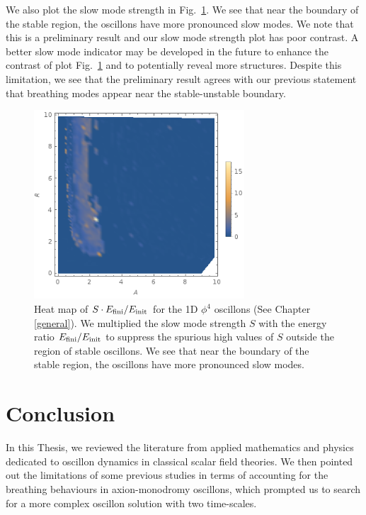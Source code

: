 \documentclass[11pt]{book}
\begin{document}
We also plot the slow mode strength in Fig.~\ref{phi4slowmode}. We see that near the boundary of the stable region, the oscillons have more pronounced slow modes. We note that this is a preliminary result and our slow mode strength plot has poor contrast. A better slow mode indicator may be developed in the future to enhance the contrast of plot Fig.~\ref{phi4slowmode} and to potentially reveal more structures. Despite this limitation, we see that the preliminary result agrees with our previous statement that breathing modes appear near the stable-unstable boundary.

\begin{figure}\centering
  \includegraphics[width=0.7\textwidth]{plot/slow-mode-phi4-1d.png}
  \caption{Heat map of $S \cdot E_{\rm fini}/E_{\rm init}$ for the 1D $\phi^4$ oscillons (See Chapter \ref{general}). We multiplied the slow mode strength $S$ with the energy ratio $E_{\rm fini}/E_{\rm init}$ to suppress the spurious high values of $S$ outside the region of stable oscillons. We see that near the boundary of the stable region, the oscillons have more pronounced slow modes.}\label{phi4slowmode}
\end{figure}

\chapter{Conclusion}

In this Thesis, we reviewed the literature from applied mathematics and physics dedicated to oscillon dynamics in classical scalar field theories. We then pointed out the limitations of some previous studies in terms of accounting for the breathing behaviours in axion-monodromy oscillons, which prompted us to search for a more complex oscillon solution with two time-scales.
\end{document}
